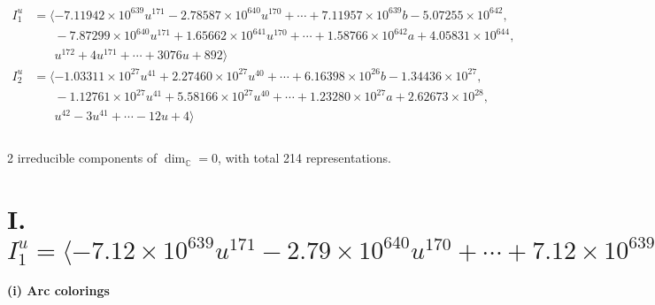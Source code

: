 \documentclass[1p]{elsarticle_modified}
\theoremstyle{definition}
\begin{document}
\begin{align*}
I^u_{1}&=\langle 
-7.11942\times10^{639} u^{171}-2.78587\times10^{640} u^{170}+\cdots+7.11957\times10^{639} b-5.07255\times10^{642},\\
\phantom{I^u_{1}}&\phantom{= \langle  }-7.87299\times10^{640} u^{171}+1.65662\times10^{641} u^{170}+\cdots+1.58766\times10^{642} a+4.05831\times10^{644},\\
\phantom{I^u_{1}}&\phantom{= \langle  }u^{172}+4 u^{171}+\cdots+3076 u+892\rangle \\
I^u_{2}&=\langle 
-1.03311\times10^{27} u^{41}+2.27460\times10^{27} u^{40}+\cdots+6.16398\times10^{26} b-1.34436\times10^{27},\\
\phantom{I^u_{2}}&\phantom{= \langle  }-1.12761\times10^{27} u^{41}+5.58166\times10^{27} u^{40}+\cdots+1.23280\times10^{27} a+2.62673\times10^{28},\\
\phantom{I^u_{2}}&\phantom{= \langle  }u^{42}-3 u^{41}+\cdots-12 u+4\rangle \\
\\
\end{align*}
\raggedright * 2 irreducible components of $\dim_{\mathbb{C}}=0$, with total 214 representations.\\
\newpage
\renewcommand{\arraystretch}{1}
\centering \section*{I. $I^u_{1}= \langle -7.12\times10^{639} u^{171}-2.79\times10^{640} u^{170}+\cdots+7.12\times10^{639} b-5.07\times10^{642},\;-7.87\times10^{640} u^{171}+1.66\times10^{641} u^{170}+\cdots+1.59\times10^{642} a+4.06\times10^{644},\;u^{172}+4 u^{171}+\cdots+3076 u+892 \rangle$}
\flushleft \textbf{(i) Arc colorings}\\
\end{document}
